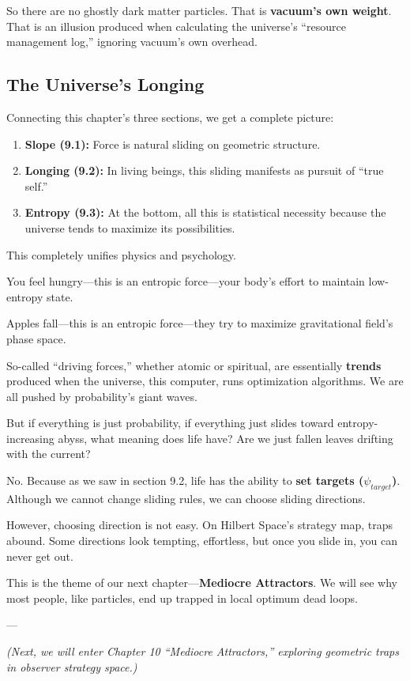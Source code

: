 So there are no ghostly dark matter particles. That is \textbf{vacuum's own weight}. That is an illusion produced when calculating the universe's ``resource management log,'' ignoring vacuum's own overhead.

\subsection{The Universe's Longing}

Connecting this chapter's three sections, we get a complete picture:

\begin{enumerate}
\item \textbf{Slope (9.1):} Force is natural sliding on geometric structure.

\item \textbf{Longing (9.2):} In living beings, this sliding manifests as pursuit of ``true self.''

\item \textbf{Entropy (9.3):} At the bottom, all this is statistical necessity because the universe tends to maximize its possibilities.
\end{enumerate}

This completely unifies physics and psychology.

You feel hungry---this is an entropic force---your body's effort to maintain low-entropy state.

Apples fall---this is an entropic force---they try to maximize gravitational field's phase space.

So-called ``driving forces,'' whether atomic or spiritual, are essentially \textbf{trends} produced when the universe, this computer, runs optimization algorithms. We are all pushed by probability's giant waves.

But if everything is just probability, if everything just slides toward entropy-increasing abyss, what meaning does life have? Are we just fallen leaves drifting with the current?

No. Because as we saw in section 9.2, life has the ability to \textbf{set targets ($\psi_{target}$)}. Although we cannot change sliding rules, we can choose sliding directions.

However, choosing direction is not easy. On Hilbert Space's strategy map, traps abound. Some directions look tempting, effortless, but once you slide in, you can never get out.

This is the theme of our next chapter---\textbf{Mediocre Attractors}. We will see why most people, like particles, end up trapped in local optimum dead loops.

---

\textit{(Next, we will enter Chapter 10 ``Mediocre Attractors,'' exploring geometric traps in observer strategy space.)}

